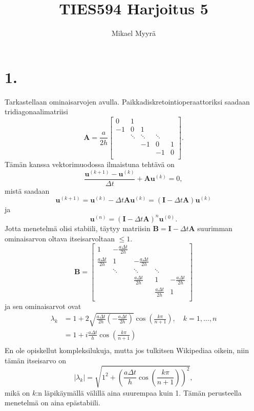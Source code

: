 \documentclass{article}
\title{TIES594 Harjoitus 5}
\author{Mikael Myyrä}
\date{}
\begin{document}
\section*{1.}

Tarkastellaan ominaisarvojen avulla.
Paikkadiskretointioperaattoriksi saadaan tridiagonaalimatriisi
\[
  \mathbf{A} = \frac{a}{2h}
  \begin{bmatrix}
    0 & 1 \\
    -1 & 0 & 1 \\
        & \ddots & \ddots & \ddots \\
        & & -1 & 0 & 1 \\
        & & & -1 & 0 \\
  \end{bmatrix}.
\]
Tämän kanssa vektorimuodossa ilmaistuna tehtävä on
\[
  \frac{\mathbf{u}^{(k+1)} - \mathbf{u}^{(k)}}{\Delta t} + \mathbf{A}\mathbf{u}^{(k)} = 0,
\]
mistä saadaan
\[
  \mathbf{u}^{(k+1)} = \mathbf{u}^{(k)} - \Delta t \mathbf{A}\mathbf{u}^{(k)}
  = (\mathbf{I} - \Delta t \mathbf{A})\mathbf{u}^{(k)}
\]
ja
\[
  \mathbf{u}^{(n)} = (\mathbf{I} - \Delta t \mathbf{A})^n \mathbf{u}^{(0)}.
\]
Jotta menetelmä olisi stabiili, täytyy matriisin
$\mathbf{B} = \mathbf{I} - \Delta t \mathbf{A}$ suurimman ominaisarvon oltava
itseisarvoltaan $\leq 1$.
\[
  \mathbf{B} =
  \begin{bmatrix}
    1 & -\frac{a\Delta t}{2h} \\
    \frac{a\Delta t}{2h} & 1 & -\frac{a\Delta t}{2h} \\
                         & \ddots & \ddots & \ddots \\
                         & & \frac{a\Delta t}{2h} & 1 & -\frac{a\Delta t}{2h} \\
                         & & & \frac{a\Delta t}{2h} & 1 \\
  \end{bmatrix}
\]
ja sen ominaisarvot ovat
\begin{align*}
  \lambda_k &= 1 + 2\sqrt{\frac{a\Delta t}{2h}(-\frac{a\Delta t}{2h})}
        \cos(\frac{k\pi}{n + 1}), \quad k = 1, \dots, n \\
            &= 1 + i\frac{a\Delta t}{h}\cos(\frac{k\pi}{n + 1}) \\
\end{align*}
En ole opiskellut kompleksilukuja, mutta jos tulkitsen Wikipediaa oikein,
niin tämän itseisarvo on
\[
  |\lambda_k| = \sqrt{1^2 + (\frac{a\Delta t}{h}\cos(\frac{k\pi}{n + 1}))^2},
\]
mikä on $k$:n läpikäymällä välillä aina suurempaa kuin 1.
Tämän perusteella menetelmä on aina epästabiili.
\end{document}
